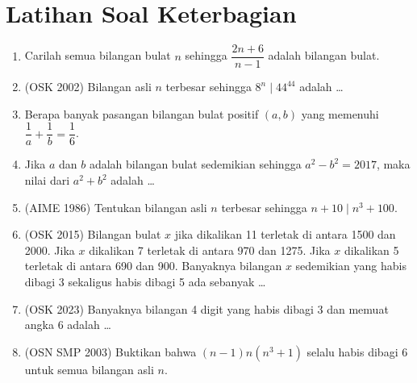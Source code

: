 \documentclass[12pt, letter]{scrartcl}
\begin{document}
\section{Latihan Soal Keterbagian}
\begin{enumerate}    
    \item Carilah semua bilangan bulat $n$ sehingga $\dfrac{2n+6}{n-1}$ adalah bilangan bulat.
    
    \item (OSK 2002) Bilangan asli $n$ terbesar sehingga $8^n \mid 44^{44}$ adalah \dots
    
    \item Berapa banyak pasangan bilangan bulat positif $(a,b)$ yang memenuhi $\dfrac{1}{a}+\dfrac{1}{b}=\dfrac{1}{6}$.
    
    \item Jika $a$ dan $b$ adalah bilangan bulat sedemikian sehingga $a^2-b^2=2017$, maka nilai dari $a^2+b^2$ adalah \dots
    
    \item (AIME 1986) Tentukan bilangan asli $n$ terbesar sehingga $n+10 \mid n^3+100$.

    \item (OSK 2015) Bilangan bulat $x$ jika dikalikan 11 terletak di antara 1500 dan 2000. Jika $x$ dikalikan 7 terletak di antara 970 dan 1275. Jika $x$ dikalikan 5 terletak di antara 690 dan 900. Banyaknya bilangan $x$ sedemikian yang habis dibagi 3 sekaligus habis dibagi 5 ada sebanyak \ldots

    \item (OSK 2023) Banyaknya bilangan 4 digit yang habis dibagi 3 dan memuat angka 6 adalah \ldots
    
    \item (OSN SMP 2003) Buktikan bahwa $(n-1)n(n^3+1)$ selalu habis dibagi 6 untuk semua bilangan asli $n$.
    
\end{enumerate}

    
    
\end{document}
